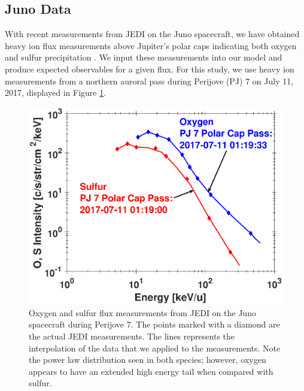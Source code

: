 \documentclass[draft]{agujournal2018}
\begin{document}
\subsection{Juno Data}

With recent measurements from JEDI \citep{mauk2017ssr} on the Juno spacecraft, we have obtained heavy ion flux measurements above Jupiter's polar caps indicating both oxygen and sulfur precipitation \citep{haggerty2017,clark2017a,clark2017b}.
We input these measurements into our model and produce expected observables for a given flux.
For this study, we use heavy ion measurements from a northern auroral pass during Perijove (PJ) 7 on July 11, 2017, displayed in Figure \ref{fig:JEDIFlux}.

\begin{figure}
    \centering
    \includegraphics[width=\textwidth]{Figures/O+S_PJ7.eps}
    \caption{Oxygen and sulfur flux measurements from JEDI on the Juno spacecraft during Perijove 7. The points marked with a diamond are the actual JEDI measurements. The lines represents the interpolation of the data that we applied to the measurements. Note the power law distribution seen in both species; however, oxygen appears to have an extended high energy tail when compared with sulfur.}
    \label{fig:JEDIFlux}
\end{figure}
\end{document}
